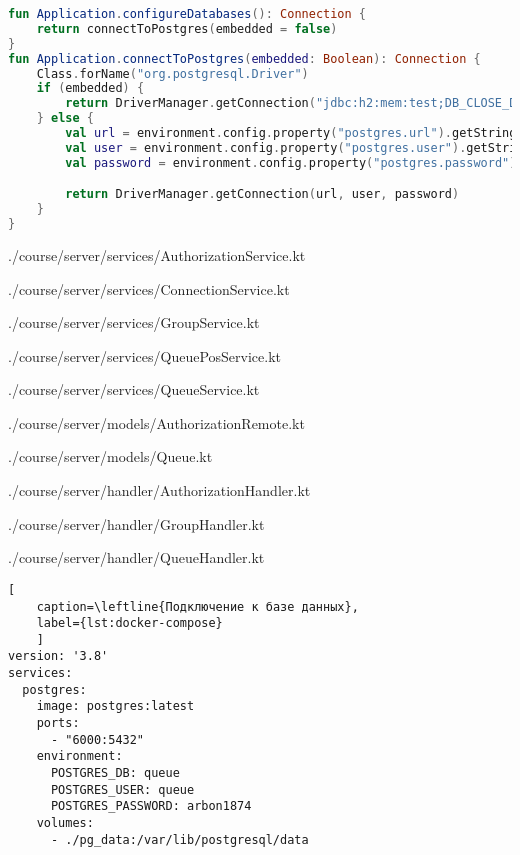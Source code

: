\label{lst:db:connect}
\begin{lstlisting}[language=Kotlin
	, caption=\leftline{Подключение к базе данных}]
fun Application.configureDatabases(): Connection {
    return connectToPostgres(embedded = false)
}
fun Application.connectToPostgres(embedded: Boolean): Connection {
    Class.forName("org.postgresql.Driver")
    if (embedded) {
        return DriverManager.getConnection("jdbc:h2:mem:test;DB_CLOSE_DELAY=-1", "root", "")
    } else {
        val url = environment.config.property("postgres.url").getString()
        val user = environment.config.property("postgres.user").getString()
        val password = environment.config.property("postgres.password").getString()

        return DriverManager.getConnection(url, user, password)
    }
}
\end{lstlisting}

\label{lst:db:service}

{./course/server/services/AuthorizationService.kt}

{./course/server/services/ConnectionService.kt}

{./course/server/services/GroupService.kt}

{./course/server/services/QueuePosService.kt}

{./course/server/services/QueueService.kt}


{./course/server/models/AuthorizationRemote.kt}

{./course/server/models/Queue.kt}



{./course/server/handler/AuthorizationHandler.kt}

{./course/server/handler/GroupHandler.kt}

{./course/server/handler/QueueHandler.kt}

\begin{lstlisting}[
	caption=\leftline{Подключение к базе данных},
	label={lst:docker-compose}
	]
version: '3.8'
services:
  postgres:
    image: postgres:latest
    ports:
      - "6000:5432"
    environment:
      POSTGRES_DB: queue
      POSTGRES_USER: queue
      POSTGRES_PASSWORD: arbon1874
    volumes:
      - ./pg_data:/var/lib/postgresql/data
\end{lstlisting}

